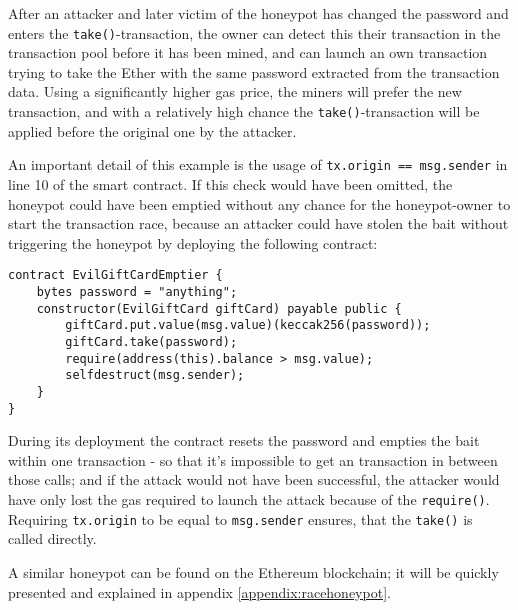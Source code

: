 After an attacker and later victim of the honeypot has changed the password and enters the \texttt{take()}-transaction, the owner can detect this their transaction in the transaction pool before it has been mined, and can launch an own transaction trying to take the Ether with the same password extracted from the transaction data. Using a significantly higher gas price, the miners will prefer the new transaction, and with a relatively high chance the \texttt{take()}-transaction will be applied before the original one by the attacker.

An important detail of this example is the usage of \texttt{tx.origin == msg.sender} in line 10 of the smart contract. If this check would have been omitted, the honeypot could have been emptied without any chance for the honeypot-owner to start the transaction race, because an attacker could have stolen the bait without triggering the honeypot by deploying the following contract:
\begin{verbatim}
contract EvilGiftCardEmptier {
    bytes password = "anything";
    constructor(EvilGiftCard giftCard) payable public {
        giftCard.put.value(msg.value)(keccak256(password));
        giftCard.take(password);
        require(address(this).balance > msg.value);
        selfdestruct(msg.sender);
    }
}
\end{verbatim}

During its deployment the contract resets the password and empties the bait within one transaction - so that it's impossible to get an transaction in between those calls; and if the attack would not have been successful, the attacker would have only lost the gas required to launch the attack because of the \texttt{require()}. Requiring \texttt{tx.origin} to be equal to \texttt{msg.sender} ensures, that the \texttt{take()} is called directly.

A similar honeypot can be found on the Ethereum blockchain; it will be quickly presented and explained in appendix \ref{appendix:racehoneypot}.

